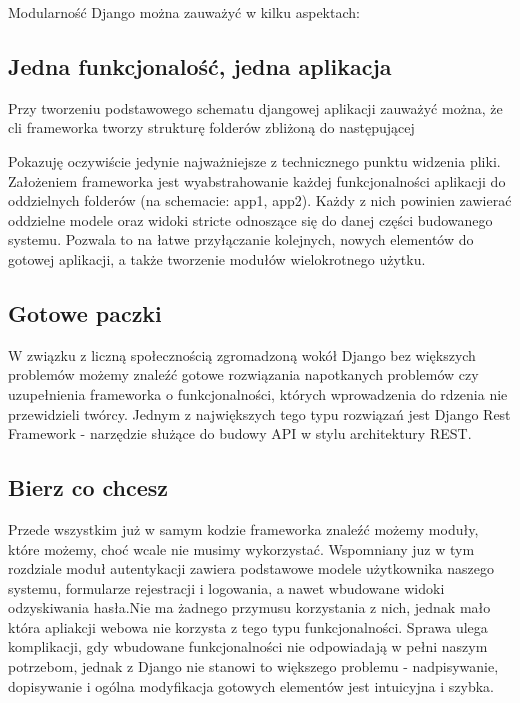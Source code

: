 Modularność Django można zauważyć w kilku aspektach: 

\subsection{Jedna funkcjonalość, jedna aplikacja}
Przy tworzeniu podstawowego schematu djangowej aplikacji zauważyć można, że cli frameworka tworzy strukturę folderów zbliżoną do następującej

Pokazuję oczywiście jedynie najważniejsze z technicznego punktu widzenia pliki.\cite{Dokument39:online} Założeniem frameworka jest wyabstrahowanie każdej funkcjonalności aplikacji do oddzielnych folderów (na schemacie: app1, app2). Każdy z nich powinien zawierać oddzielne modele oraz widoki stricte odnoszące się do danej części budowanego systemu. Pozwala to na łatwe przyłączanie kolejnych, nowych elementów do gotowej aplikacji, a także tworzenie modułów wielokrotnego użytku.

\subsection{Gotowe paczki}
W związku z liczną społecznością zgromadzoną wokół Django bez większych problemów możemy znaleźć gotowe rozwiązania napotkanych problemów czy uzupełnienia frameworka o funkcjonalności, których wprowadzenia do rdzenia nie przewidzieli twórcy. Jednym z największych tego typu rozwiązań jest Django Rest Framework - narzędzie służące do budowy API w stylu architektury REST.

\subsection{Bierz co chcesz}
Przede wszystkim już w samym kodzie frameworka znaleźć możemy moduły, które możemy, choć wcale nie musimy wykorzystać. Wspomniany juz w tym rozdziale moduł autentykacji zawiera podstawowe modele użytkownika naszego systemu, formularze rejestracji i logowania, a nawet wbudowane widoki odzyskiwania hasła.Nie ma żadnego przymusu korzystania z nich, jednak mało która apliakcji webowa nie korzysta z tego typu funkcjonalności. Sprawa ulega komplikacji, gdy wbudowane funkcjonalności nie odpowiadają w pełni naszym potrzebom, jednak z Django nie stanowi to większego problemu - nadpisywanie, dopisywanie i ogólna modyfikacja gotowych elementów jest intuicyjna i szybka.

